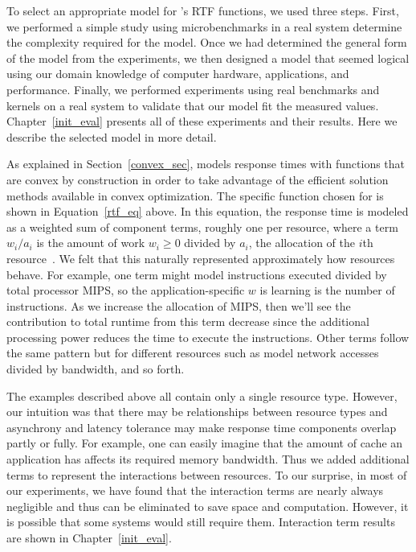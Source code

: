 To select an appropriate model for \pacora's RTF functions, we used three steps.  First, we performed a simple study using microbenchmarks in a real system determine the complexity required for the model. Once we had determined the general form of the model from the experiments, we then designed a model that seemed logical using our domain knowledge of computer hardware, applications, and performance.  Finally, we performed experiments using real benchmarks and kernels on a real system to validate that our model fit the measured values.  Chapter~\ref{init_eval} presents all of these experiments and their results.   Here we describe the selected model in more detail. 

As explained in Section~\ref{convex_sec}, \pacora models response times with functions that are convex by construction in order to take advantage of the efficient solution methods available in convex optimization.
The specific function chosen for \pacora is shown in Equation~\ref{rtf_eq} above.
In this equation, the response time is modeled as a weighted sum of component terms,
roughly one per resource, where a term $w_i/a_i$ is the amount of work $w_i \geq 0$ divided by $a_i$, the allocation of the $i$th resource~\cite{Snav}.  We felt that this naturally represented approximately how resources behave. For example, one term might model instructions executed divided by total processor MIPS, so the application-specific $w$ \pacora is learning is the number of instructions.  As we increase the allocation of MIPS, then we'll see the contribution to total runtime from this term decrease since the additional processing power reduces the time to execute the instructions.  Other terms follow the same pattern but for different resources such as model network accesses divided by bandwidth, and so forth.

The examples described above all contain only a single resource type.  However, our intuition was that there may be relationships between resource types and asynchrony and latency tolerance may make response time components overlap partly or fully. For example, one can easily imagine that the amount of cache an application has affects its required memory bandwidth.  Thus we added additional terms to represent the interactions between resources.  To our surprise, in most of our experiments, we have found that the interaction terms are nearly always negligible and thus can be eliminated to save space and computation.  However, it is possible that some systems would still require them.  Interaction term results are shown in Chapter~\ref{init_eval}.   

